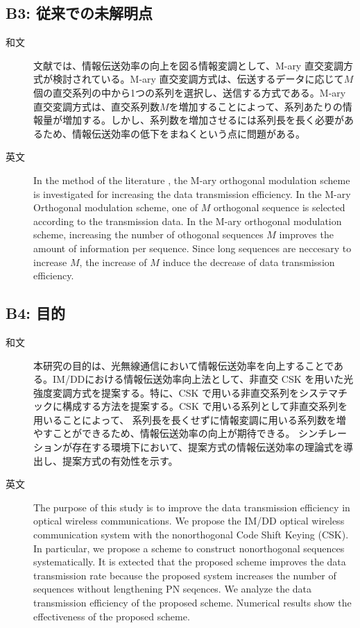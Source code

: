 ﻿\documentclass[a4j,10pt]{jarticle}
\begin{document}
\subsection{B3: 従来での未解明点} %
\begin{description}
 \item[和文] 文献\cite{csk1}\cite{csk2}では、情報伝送効率の向上を図る情報変調として、M-ary 直交変調方式が検討されている。M-ary 直交変調方式は、伝送するデータに応じて$M$個の直交系列の中から1つの系列を選択し、送信する方式である。M-ary 直交変調方式は、直交系列数$M$を増加することによって、系列あたりの情報量が増加する。しかし、系列数を増加させるには系列長を長く必要があるため、情報伝送効率の低下をまねくという点に問題がある。
%
 \item[英文] In the method of the literature \cite{csk1}\cite{csk2}, the M-ary orthogonal modulation scheme is investigated for increasing the data transmission efficiency. In the M-ary Orthogonal modulation scheme, one of $M$ orthogonal sequence is selected according to the transmission data. In the M-ary orthogonal modulation scheme, increasing the number of othogonal sequences $M$ improves the amount of information per sequence. Since long sequences are neccesary to increase $M$, the increase of $M$ induce the decrease of data transmission efficiency. 
\end{description}
%
\subsection{B4: 目的} %
\begin{description}
 \item[和文] 本研究の目的は、光無線通信において情報伝送効率を向上することである。IM/DDにおける情報伝送効率向上法として、非直交 CSK を用いた光強度変調方式を提案する。特に、CSK で用いる非直交系列をシステマチックに構成する方法を提案する。CSK で用いる系列として非直交系列を用いることによって、
系列長を長くせずに情報変調に用いる系列数を増やすことができるため、情報伝送効率の向上が期待できる。
シンチレーションが存在する環境下において、提案方式の情報伝送効率の理論式を導出し、提案方式の有効性を示す。
%
 \item[英文] The purpose of this study is to improve the data transmission efficiency in optical wireless communications. We propose the IM/DD optical wireless communication system with the nonorthogonal Code Shift Keying (CSK). In particular, we propose a scheme to construct nonorthogonal sequences systematically. It is extected that the proposed scheme improves the data transmission rate because the proposed system increases the number of sequences without lengthening PN seqences. We analyze the data transmission efficiency of the proposed scheme. Numerical results show the effectiveness of the proposed scheme. 
\end{description}
%
\end{document}
